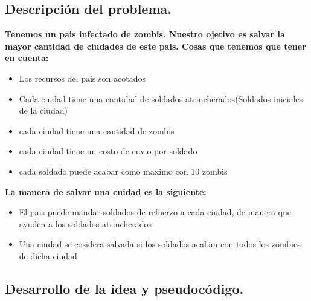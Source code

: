 \subsection{Descripción del problema.}

\vspace*{0.3cm}

\textbf{
Tenemos un pais infectado de zombis. Nuestro ojetivo es salvar la mayor cantidad de ciudades de este pais.
Cosas que tenemos que tener en cuenta:
}
\begin{itemize}
   \item Los recursos del pais son acotados 
   \item Cada ciudad tiene una cantidad de soldados atrincherados(Soldados iniciales de la ciudad)  
   \item cada ciudad tiene una cantidad de zombis  
   \item cada ciudad tiene un costo de envio por soldado
   \item cada soldado puede acabar como maximo con 10 zombis 
\end{itemize}

\textbf{
La manera de salvar una cuidad es la siguiente:
}         
\begin{itemize}
	\item El pais puede mandar soldados de refuerzo a cada ciudad, de manera que ayuden a los soldados atrincherados
	\item Una ciudad se cosidera salvada si los soldados acaban con todos los zombies de dicha ciudad
\end{itemize}





\newpage
\subsection{Desarrollo de la idea y pseudocódigo.}

\vspace*{0.3cm}

